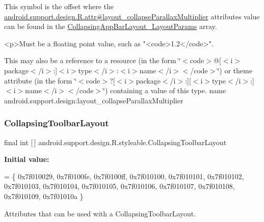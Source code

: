 This symbol is the offset where the \hyperlink{classandroid_1_1support_1_1design_1_1R_1_1attr_ae85e2416514fea66a3b15a31f8c6ec9c}{android.\+support.\+design.\+R.\+attr\#layout\+\_\+collapse\+Parallax\+Multiplier} attribute\textquotesingle{}s value can be found in the \hyperlink{classandroid_1_1support_1_1design_1_1R_1_1styleable_a84348eab6e616d953feaef19d531ee2f}{Collapsing\+App\+Bar\+Layout\+\_\+\+Layout\+Params} array.

\begin{DoxyVerb}      <p>Must be a floating point value, such as "<code>1.2</code>".
\end{DoxyVerb}
 

This may also be a reference to a resource (in the form \char`\"{}$<$code$>$@\mbox{[}$<$i$>$package$<$/i$>$\+:\mbox{]}$<$i$>$type$<$/i$>$\+:$<$i$>$name$<$/i$>$$<$/code$>$\char`\"{}) or theme attribute (in the form \char`\"{}$<$code$>$?\mbox{[}$<$i$>$package$<$/i$>$\+:\mbox{]}\mbox{[}$<$i$>$type$<$/i$>$\+:\mbox{]}$<$i$>$name$<$/i$>$$<$/code$>$\char`\"{}) containing a value of this type.  name android.\+support.\+design\+:layout\+\_\+collapse\+Parallax\+Multiplier \mbox{\label{classandroid_1_1support_1_1design_1_1R_1_1styleable_a4a019838b1c3daad84b4ffff397db335}} 
\subsubsection{\texorpdfstring{Collapsing\+Toolbar\+Layout}{CollapsingToolbarLayout}}
{\footnotesize\ttfamily final int \mbox{[}$\,$\mbox{]} android.\+support.\+design.\+R.\+styleable.\+Collapsing\+Toolbar\+Layout\hspace{0.3cm}{\ttfamily [static]}}

{\bfseries Initial value\+:}
\begin{DoxyCode}
= \{
            0x7f010029, 0x7f0100fe, 0x7f0100ff, 0x7f010100,
            0x7f010101, 0x7f010102, 0x7f010103, 0x7f010104,
            0x7f010105, 0x7f010106, 0x7f010107, 0x7f010108,
            0x7f010109, 0x7f01010a
        \}
\end{DoxyCode}
Attributes that can be used with a Collapsing\+Toolbar\+Layout. 

